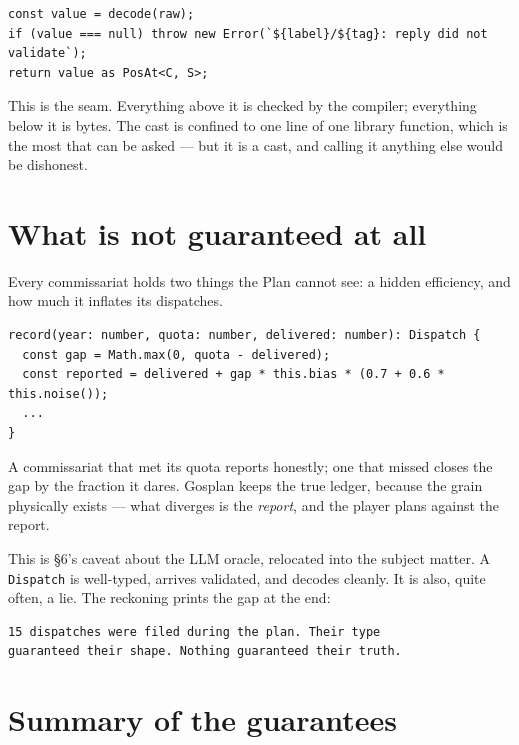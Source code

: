 \documentclass[11pt,a4paper]{article}
\begin{document}
\begin{lstlisting}
const value = decode(raw);
if (value === null) throw new Error(`${label}/${tag}: reply did not validate`);
return value as PosAt<C, S>;
\end{lstlisting}

\noindent This is the seam. Everything above it is checked by the compiler;
everything below it is bytes. The cast is confined to one line of one library
function, which is the most that can be asked --- but it is a cast, and calling
it anything else would be dishonest.

\section{What is not guaranteed at all}

Every commissariat holds two things the Plan cannot see: a hidden efficiency,
and how much it inflates its dispatches.

\begin{lstlisting}
record(year: number, quota: number, delivered: number): Dispatch {
  const gap = Math.max(0, quota - delivered);
  const reported = delivered + gap * this.bias * (0.7 + 0.6 * this.noise());
  ...
}
\end{lstlisting}

\noindent A commissariat that met its quota reports honestly; one that missed
closes the gap by the fraction it dares. Gosplan keeps the true ledger, because
the grain physically exists --- what diverges is the \emph{report}, and the
player plans against the report.

This is \S6's caveat about the LLM oracle, relocated into the subject matter. A
\texttt{Dispatch} is well-typed, arrives validated, and decodes cleanly. It is
also, quite often, a lie. The reckoning prints the gap at the end:

\begin{lstlisting}
15 dispatches were filed during the plan. Their type
guaranteed their shape. Nothing guaranteed their truth.
\end{lstlisting}

\section{Summary of the guarantees}
\end{document}
